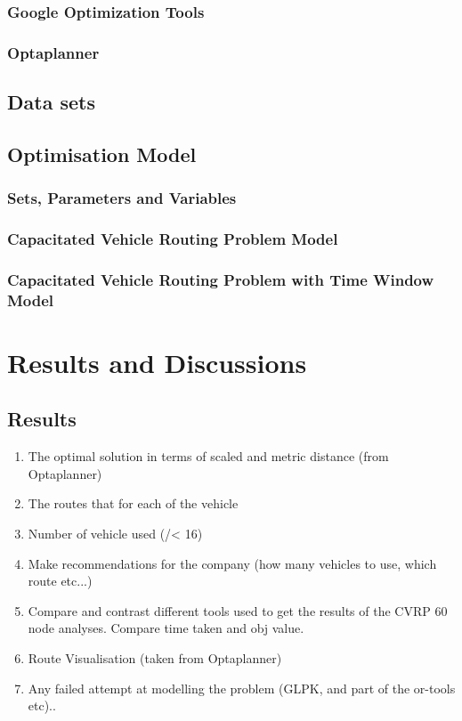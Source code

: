 \documentclass[a4paper, 12pt]{report}
\begin{document}
\subsection{Google Optimization Tools}
\subsection{Optaplanner}

\section{Data sets}

\section{Optimisation Model}
\subsection{Sets, Parameters and Variables}
\subsection{Capacitated Vehicle Routing Problem Model}
\subsection{Capacitated Vehicle Routing Problem with Time Window Model}

\chapter{Results and Discussions}
\section{Results}
\begin{enumerate}
\item The optimal solution in terms of scaled and metric distance (from Optaplanner)
\item The routes that for each of the vehicle
\item Number of vehicle used (/< 16)
\item Make recommendations for the company (how many vehicles to use, which route etc...)
\item Compare and contrast different tools used to get the results of the CVRP 60 node analyses. Compare time taken and obj value.
\item Route Visualisation (taken from Optaplanner)
\item Any failed attempt at modelling the problem (GLPK, and part of the or-tools etc)..
\end{enumerate}
\end{document}
